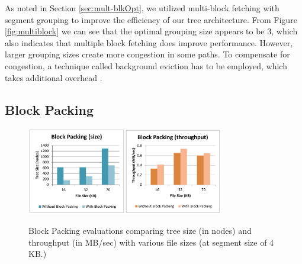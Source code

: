 \documentclass[conference]{IEEEtran}
\begin{document}
As noted in Section \ref{sec:mult-blkOpt}, we utilized multi-block fetching with segment grouping to improve the efficiency of our tree architecture. From Figure \ref{fig:multiblock} we can see that the optimal grouping size appears to be 3, which also indicates that multiple block fetching does improve performance. However, larger grouping sizes create more congestion in some paths. To compensate for congestion, a technique called background eviction has to be employed, which takes additional overhead \cite{oram-isca13, Yu14DSB}.

\subsection{Block Packing}

\label{sec:BlkPack}
\begin{figure}
\begin{center}
\noindent\includegraphics[width=4.3cm]{550.pdf}\includegraphics[width=4.3cm]{551.pdf}
\caption{Block Packing evaluations comparing tree size (in nodes) and throughput (in MB/sec)  with various file sizes (at segment size of 4 KB.)}
\label{fig:blockpack}
\end{center}
\end{figure}
\end{document}
